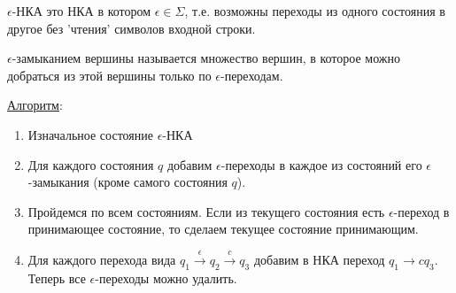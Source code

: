 
\begin{definition}
  \(\epsilon\)-НКА это НКА в котором \(\epsilon \in \Sigma\), т.е. возможны
  переходы из одного состояния в другое без 'чтения' символов входной строки.
\end{definition}

\begin{definition}
  \(\epsilon\)-замыканием вершины называется множество вершин, в которое можно
  добраться из этой вершины только по \(\epsilon\)-переходам.
\end{definition}

\underline{Алгоритм}:





\begin{enumerate}
  \item Изначальное состояние \(\epsilon\)-НКА
  
  \item Для каждого состояния \(q\) добавим \(\epsilon\)-переходы в каждое из
  состояний его \(\epsilon\)-замыкания (кроме самого состояния \(q\)).

  \item Пройдемся по всем состояниям. Если из текущего состояния есть
  \(\epsilon\)-переход в принимающее состояние, то сделаем текущее состояние
  принимающим.

  \item Для каждого перехода вида
  \(q_{1} \xrightarrow{\epsilon} q_{2} \xrightarrow{c} q_{3}\)
  добавим в НКА переход \(q_{1} \rightarrow{c} q_{3}\).
  Теперь все \(\epsilon\)-переходы можно удалить.
\end{enumerate}